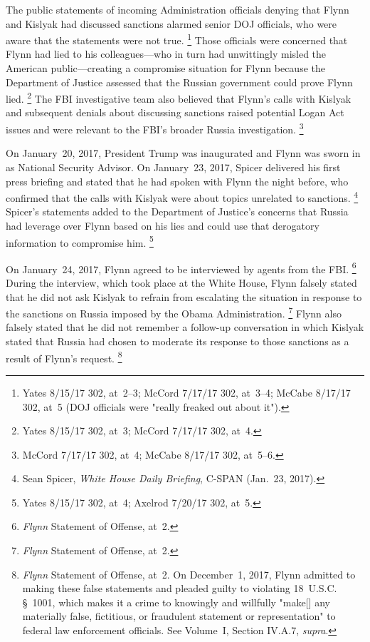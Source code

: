 The public statements of incoming Administration officials denying that Flynn and Kislyak had discussed sanctions alarmed senior DOJ officials, who were aware that the statements were not true.%
\footnote{Yates 8/15/17 302, at~2--3;
McCord 7/17/17 302, at~3--4;
McCabe 8/17/17 302, at~5 (DOJ officials were "really freaked out about it").}
Those officials were concerned that Flynn had lied to his colleagues---who in turn had unwittingly misled the American public---creating a compromise situation for Flynn because the Department of Justice assessed that the Russian government could prove Flynn lied.%
\footnote{Yates 8/15/17 302, at~3;
McCord 7/17/17 302, at~4.}
The FBI investigative team also believed that Flynn's calls with Kislyak and subsequent denials about discussing sanctions raised potential Logan Act issues and were relevant to the FBI's broader Russia investigation.%
\footnote{McCord 7/17/17 302, at~4;
McCabe 8/17/17 302, at~5--6.}

On January~20, 2017, President Trump was inaugurated and Flynn was sworn in as National Security Advisor.
On January~23, 2017, Spicer delivered his first press briefing and stated that he had spoken with Flynn the night before, who confirmed that the calls with Kislyak were about topics unrelated to sanctions.%
\footnote{Sean Spicer, \textit{White House Daily Briefing}, C-SPAN (Jan.~23, 2017).}
Spicer's statements added to the Department of Justice's concerns that Russia had leverage over Flynn based on his lies and could use that derogatory information to compromise him.%
\footnote{Yates 8/15/17 302, at~4;
Axelrod 7/20/17 302, at~5.}

On January~24, 2017, Flynn agreed to be interviewed by agents from the FBI\null.%
\footnote{\textit{Flynn} Statement of Offense, at~2.}
During the interview, which took place at the White House, Flynn falsely stated that he did not ask Kislyak to refrain from escalating the situation in response to the sanctions on Russia imposed by the Obama Administration.%
\footnote{\textit{Flynn} Statement of Offense, at~2.}
Flynn also falsely stated that he did not remember a follow-up conversation in which Kislyak stated that Russia had chosen to moderate its response to those sanctions as a result of Flynn's request.%
\footnote{\textit{Flynn} Statement of Offense, at~2.
On December~1, 2017, Flynn admitted to making these false statements and pleaded guilty to violating 18~U.S.C. \S~1001, which makes it a crime to knowingly and willfully "make[] any materially false, fictitious, or fraudulent statement or representation" to federal law enforcement officials.
See Volume~I, Section IV.A.7, \textit{supra}.}


